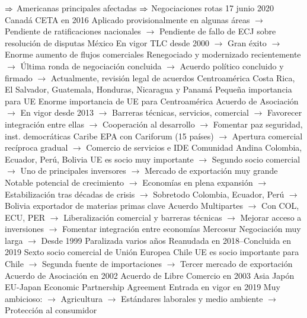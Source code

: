 \documentclass{nuevotema}
\begin{document}
\begin{esquemal}
				\4[] $\Rightarrow$ Americanas principales afectadas
				\4[] $\Rightarrow$ Negociaciones rotas 17 junio 2020
				\4 Canadá
				\4[] CETA en 2016
				\4[] Aplicado provisionalmente en algunas áreas
				\4[] $\to$ Pendiente de ratificaciones nacionales
				\4[] $\to$ Pendiente de fallo de ECJ sobre resolución de disputas
				\4 México
				\4[] En vigor TLC desde 2000
				\4[] $\to$ Gran éxito
				\4[] $\to$ Enorme aumento de flujos comerciales
				\4[] Renegociado y modernizado recientemente
				\4[] $\to$ Última ronda de negociación concluida
				\4[] $\to$ Acuerdo político concluido y firmado
				\4[] $\to$ Actualmente, revisión legal de acuerdos
				\4 Centroamérica
				\4[] Costa Rica, El Salvador, Guatemala,
				\4[] Honduras, Nicaragua y Panamá
				\4[] Pequeña importancia para UE
				\4[] Enorme importancia de UE para Centroamérica
				\4[] Acuerdo de Asociación
				\4[] $\to$ En vigor desde 2013
				\4[] $\to$ Barreras técnicas, servicios, comercial
				\4[] $\to$ Favorecer integración entre ellas
				\4[] $\to$ Cooperación al desarrollo
				\4[] $\to$ Fomentar paz seguridad, inst. democráticas
				\4 Caribe
				\4[] EPA con Cariforum (15 países)
				\4[] $\to$ Apertura comercial recíproca gradual
				\4[] $\to$ Comercio de servicios e IDE
				\4 Comunidad Andina
				\4[] Colombia, Ecuador, Perú, Bolivia
				\4[] UE es socio muy importante
				\4[] $\to$ Segundo socio comercial
				\4[] $\to$ Uno de principales inversores
				\4[] $\to$ Mercado de exportación muy grande
				\4[] Notable potencial de crecimiento
				\4[] $\to$ Economías en plena expansión
				\4[] $\to$ Estabilización tras décadas de crisis
				\4[] $\to$ Sobretodo Colombia, Ecuador, Perú
				\4[] $\to$ Bolivia exportador de materias primas clave
				\4[] Acuerdo Multipartes
				\4[] $\to$ Con COL, ECU, PER
				\4[] $\to$ Liberalización comercial y barreras técnicas
				\4[] $\to$ Mejorar acceso a inversiones
				\4[] $\to$ Fomentar integración entre economías
				\4 Mercosur
				\4[] Negociación muy larga
				\4[] $\to$ Desde 1999
				\4[] Paralizada varios años
				\4[] Reanudada en 2018--Concluida en 2019
				\4[] Sexto socio comercial de Unión Europea
				\4 Chile
				\4[] UE es socio importante para Chile
				\4[] $\to$ Segunda fuente de importaciones
				\4[] $\to$ Tercer mercado de exportación
				\4[] Acuerdo de Asociación en 2002
				\4[] Acuerdo de Libre Comercio en 2003
			\3 Asia
				\4 Japón
				\4[] EU-Japan Economic Partnership Agreement
				\4[] Entrada en vigor en 2019
				\4[] Muy ambicioso:
				\4[] $\to$ Agricultura
				\4[] $\to$ Estándares laborales y medio ambiente
				\4[] $\to$ Protección al consumidor

\end{esquemal}
\end{document}
